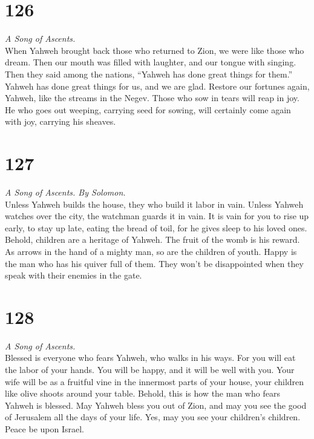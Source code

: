 \hypertarget{section-125}{%
\section{126}\label{section-125}}

\emph{A Song of Ascents.}\\
 When Yahweh brought back those who returned to Zion, we
were like those who dream.  Then our mouth was filled with
laughter, and our tongue with singing. Then they said among the nations,
``Yahweh has done great things for them.''  Yahweh has
done great things for us, and we are glad.  Restore our
fortunes again, Yahweh, like the streams in the Negev. 
Those who sow in tears will reap in joy.  He who goes out
weeping, carrying seed for sowing, will certainly come again with joy,
carrying his sheaves.

\hypertarget{section-126}{%
\section{127}\label{section-126}}

\emph{A Song of Ascents. By Solomon.}\\
 Unless Yahweh builds the house, they who build it labor
in vain. Unless Yahweh watches over the city, the watchman guards it in
vain.  It is vain for you to rise up early, to stay up
late, eating the bread of toil, for he gives sleep to his loved ones.
 Behold, children are a heritage of Yahweh. The fruit of
the womb is his reward.  As arrows in the hand of a mighty
man, so are the children of youth.  Happy is the man who
has his quiver full of them. They won't be disappointed when they speak
with their enemies in the gate.

\hypertarget{section-127}{%
\section{128}\label{section-127}}

\emph{A Song of Ascents.}\\
 Blessed is everyone who fears Yahweh, who walks in his
ways.  For you will eat the labor of your hands. You will
be happy, and it will be well with you.  Your wife will be
as a fruitful vine in the innermost parts of your house, your children
like olive shoots around your table.  Behold, this is how
the man who fears Yahweh is blessed.  May Yahweh bless you
out of Zion, and may you see the good of Jerusalem all the days of your
life.  Yes, may you see your children's children. Peace be
upon Israel.

